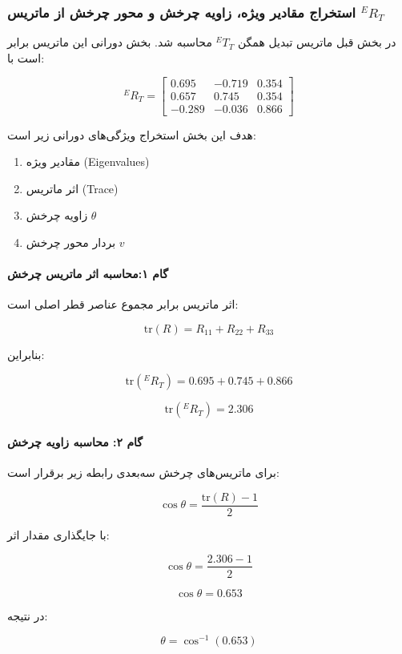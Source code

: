 \documentclass{article}
\begin{document}
\subsubsection{استخراج مقادیر ویژه، زاویه چرخش و محور چرخش از ماتریس \( {}^{E}R_{T} \)}

در بخش قبل ماتریس تبدیل همگن \( {}^{E}T_{T} \) محاسبه شد. بخش دورانی این ماتریس برابر است با:

\[
{}^{E}R_{T}=
\begin{bmatrix}
	0.695 & -0.719 & 0.354\\
	0.657 & 0.745 & 0.354\\
	-0.289 & -0.036 & 0.866
\end{bmatrix}
\]

هدف این بخش استخراج ویژگی‌های دورانی زیر است:

\begin{enumerate}
	\item مقادیر ویژه (Eigenvalues)
	\item اثر ماتریس (Trace)
	\item زاویه چرخش \( \theta \)
	\item بردار محور چرخش \( v \)
\end{enumerate}

\paragraph{ گام ۱:محاسبه اثر ماتریس چرخش}

اثر ماتریس برابر مجموع عناصر قطر اصلی است:

\[
\text{tr}(R) = R_{11}+R_{22}+R_{33}
\]

بنابراین:

\[
\text{tr}({}^{E}R_{T}) =
0.695 + 0.745 + 0.866
\]

\[
\text{tr}({}^{E}R_{T}) = 2.306
\]

\paragraph{گام ۲: محاسبه زاویه چرخش}

برای ماتریس‌های چرخش سه‌بعدی رابطه زیر برقرار است:

\[
\cos\theta = \frac{\text{tr}(R)-1}{2}
\]

با جایگذاری مقدار اثر:

\[
\cos\theta =
\frac{2.306-1}{2}
\]

\[
\cos\theta = 0.653
\]

در نتیجه:

\[
\theta = \cos^{-1}(0.653)
\]
\end{document}
